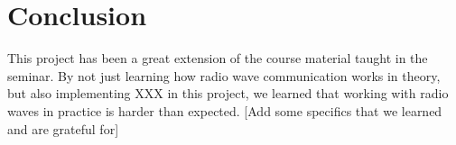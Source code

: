 \chapter{Conclusion}

This project has been a great extension of the course material taught in the seminar. By not just learning how radio wave communication works in theory, but also implementing XXX in this project, we learned that working with radio waves in practice is harder than expected. [Add some specifics that we learned and are grateful for]
